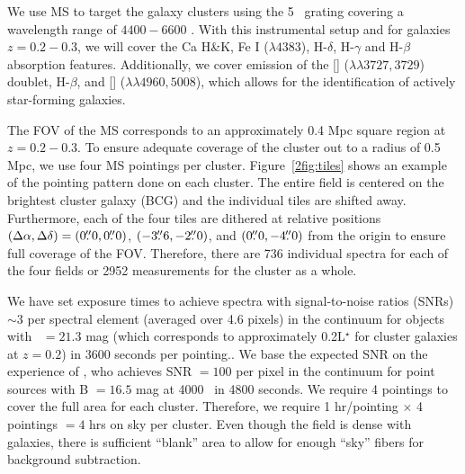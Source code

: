 We use MS to target the galaxy clusters using the 5 \AAA\ grating covering a wavelength range of $4400 - 6600$ \AAA. With this instrumental setup and for galaxies $z = 0.2-0.3$, we will cover the Ca H\&K, Fe I ($\lambda 4383$), H-$\delta$, H-$\gamma$ and H-$\beta$ absorption features. Additionally, we cover emission of the \hbox{[]} ($\lambda\lambda 3727,3729$) doublet, H-$\beta$, and \hbox{[]} ($\lambda\lambda 4960,5008$), which allows for the identification of actively star-forming galaxies.

The FOV of the MS corresponds to an approximately 0.4 Mpc square region at $z = 0.2-0.3$. To ensure adequate coverage of the cluster out to a radius of 0.5 Mpc, we use four MS pointings per cluster. Figure~\ref{2fig:tiles} shows an example of the pointing pattern done on each cluster. The entire field is centered on the brightest cluster galaxy (BCG) and the individual tiles are shifted away. Furthermore, each of the four tiles are dithered at relative positions $(\Delta \alpha, \Delta \delta)=(0\mbox{\ensuremath{.\!\!^{\prime\prime}}}0,0\mbox{\ensuremath{.\!\!^{\prime\prime}}}0)$, $(-3\mbox{\ensuremath{.\!\!^{\prime\prime}}}6,-2\mbox{\ensuremath{.\!\!^{\prime\prime}}}0)$, and $(0\mbox{\ensuremath{.\!\!^{\prime\prime}}}0, -4\mbox{\ensuremath{.\!\!^{\prime\prime}}}0)$ from the origin to ensure full coverage of the FOV. Therefore, there are 736 individual spectra for each of the four fields or 2952 measurements for the cluster as a whole.

We have set exposure times to achieve spectra with signal-to-noise ratios (SNRs) $\sim3$ per spectral element (averaged over 4.6 pixels) in the continuum for objects with \sdssg\ $= 21.3$ mag (which corresponds to approximately 0.2L$^\star$ for cluster galaxies at $z = 0.2$) in 3600 seconds per pointing.. We base the expected SNR on the experience of \cite{Shetrone2010}, who achieves SNR $= 100$ per pixel in the continuum for point sources with B $=16.5$ mag at 4000 \AAA\ in 4800 seconds. We require 4 pointings to cover the full area for each cluster. Therefore, we require 1 hr/pointing $\times$ 4 pointings $= 4$ hrs on sky per cluster. Even though the field is dense with galaxies, there is sufficient ``blank'' area to allow for enough ``sky'' fibers for background subtraction.

